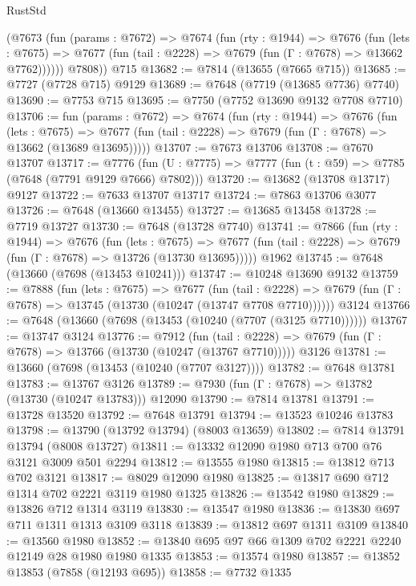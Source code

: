 \begin{lexlean}{RustStd}
\begin{coremodule}
{\begin{coremodule}
{{{{{{{{{{{{{{{{{{{{{{{{{{{{{{{{{{{{{{{{{{{{{{{{{{{{{        (@7673
          (fun (params : @7672) =>
          @7674
            (fun (rty : @1944) =>
            @7676
              (fun (lets : @7675) =>
              @7677 (fun (tail : @2228) => @7679 (fun (Γ : @7678) => @13662 @7762))))))
        @7808))
    @715
@13682 := @7814 (@13655 (@7665 @715))
@13685 := @7727 (@7728 @715) @9129
@13689 := @7648 (@7719 (@13685 @7736) @7740)
@13690 := @7753 @715
@13695 := @7750 (@7752 @13690 @9132 @7708 @7710)
@13706 := fun (params : @7672) =>
  @7674
    (fun (rty : @1944) =>
    @7676
      (fun (lets : @7675) =>
      @7677 (fun (tail : @2228) => @7679 (fun (Γ : @7678) => @13662 (@13689 @13695)))))
@13707 := @7673 @13706
@13708 := @7670 @13707
@13717 := @7776
    (fun (U : @7775) => @7777 (fun (t : @59) => @7785 (@7648 (@7791 @9129 @7666) @7802)))
@13720 := @13682 (@13708 @13717) @9127
@13722 := @7633 @13707 @13717
@13724 := @7863 @13706 @3077
@13726 := @7648 (@13660 @13455)
@13727 := @13685 @13458
@13728 := @7719 @13727
@13730 := @7648 (@13728 @7740)
@13741 := @7866
    (fun (rty : @1944) =>
    @7676
      (fun (lets : @7675) =>
      @7677 (fun (tail : @2228) => @7679 (fun (Γ : @7678) => @13726 (@13730 @13695)))))
    @1962
@13745 := @7648 (@13660 (@7698 (@13453 @10241)))
@13747 := @10248 @13690 @9132
@13759 := @7888
    (fun (lets : @7675) =>
    @7677
      (fun (tail : @2228) =>
      @7679 (fun (Γ : @7678) => @13745 (@13730 (@10247 (@13747 @7708 @7710))))))
    @3124
@13766 := @7648 (@13660 (@7698 (@13453 (@10240 (@7707 (@3125 @7710))))))
@13767 := @13747 @3124
@13776 := @7912
    (fun (tail : @2228) => @7679 (fun (Γ : @7678) => @13766 (@13730 (@10247 (@13767 @7710)))))
    @3126
@13781 := @13660 (@7698 (@13453 (@10240 (@7707 @3127))))
@13782 := @7648 @13781
@13783 := @13767 @3126
@13789 := @7930 (fun (Γ : @7678) => @13782 (@13730 (@10247 @13783))) @12090
@13790 := @7814 @13781
@13791 := @13728 @13520
@13792 := @7648 @13791
@13794 := @13523 @10246 @13783
@13798 := @13790 (@13792 @13794) (@8003 @13659)
@13802 := @7814 @13791 @13794 (@8008 @13727)
@13811 := @13332 @12090 @1980 @713 @700 @76 @3121 @3009 @501 @2294
@13812 := @13555 @1980
@13815 := @13812 @713 @702 @3121
@13817 := @8029 @12090 @1980
@13825 := @13817 @690 @712 @1314 @702 @2221 @3119 @1980 @1325
@13826 := @13542 @1980
@13829 := @13826 @712 @1314 @3119
@13830 := @13547 @1980
@13836 := @13830 @697 @711 @1311 @1313 @3109 @3118
@13839 := @13812 @697 @1311 @3109
@13840 := @13560 @1980
@13852 := @13840 @695 @97 @66 @1309 @702 @2221 @2240 @12149 @28 @1980 @1980 @1335
@13853 := @13574 @1980
@13857 := @13852 @13853 (@7858 (@12193 @695))
@13858 := @7732 @1335
}}}}}}}}}}}}}}}}}}}}}}}}}}}}}}}}}}}}}}}}}}}}}}}}}}}}}
\end{coremodule}}
\end{coremodule}
\end{lexlean}
